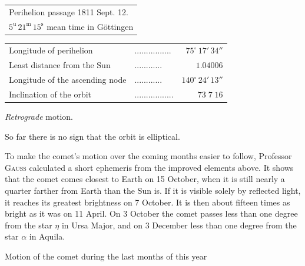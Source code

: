\begin{center}\fontsize{10}{12}\selectfont\setlength{\tabcolsep}{4pt}\renewcommand{\arraystretch}{1.15}\begin{tabular}{l}
Perihelion passage 1811 Sept. 12.\\
\quad $5^{\mathrm u}\,21^{\mathrm m}\,15^{\mathrm s}$ mean time in Göttingen\\
\end{tabular}\end{center}
\begin{center}\fontsize{9}{11}\selectfont\setlength{\tabcolsep}{2pt}\renewcommand{\arraystretch}{1.15}\begin{tabular}{llr}
Longitude of perihelion & .\;.\;.\;.\;.\;.\;.\;.\;.\;.\;.\;.\;.\;.\;.\;. & $75^\circ\,17'\,34''$\\
Least distance from the Sun & .\;.\;.\;.\;.\;.\;.\;.\;.\;.\;.\;. & $1.04006$\\
Longitude of the ascending node & .\;.\;.\;.\;.\;.\;.\;.\;.\;.\;.\;. & $140^\circ\,24'\,13''$\\
Inclination of the orbit & .\;.\;.\;.\;.\;.\;.\;.\;.\;.\;.\;.\;.\;.\;.\;.\;. & $73\;7\;16$\\
\end{tabular}\end{center}
\noindent \emph{Retrograde} motion.

\par\indent So far there is no sign that the orbit is elliptical.

\par\indent To make the comet’s motion over the coming months easier to follow, Professor \textsc{Gauss} calculated a short ephemeris from the improved elements above. It shows that the comet comes closest to Earth on 15 October, when it is still nearly a quarter farther from Earth than the Sun is. If it is visible solely by reflected light, it reaches its greatest brightness on 7 October. It is then about fifteen times as bright as it was on 11 April. On 3 October the comet passes less than one degree from the star $\eta$ in Ursa Major, and on 3 December less than one degree from the star $\alpha$ in Aquila.

\noindent Motion of the comet during the last months of this year

